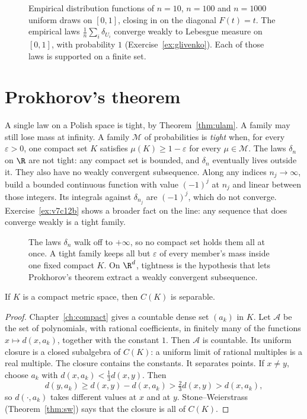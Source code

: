 \begin{figure}[ht]
\centering
{}
\caption{Empirical distribution functions of $n=10$, $n=100$ and $n=1000$ uniform draws on $[0,1]$, closing in on the diagonal $F(t)=t$.
The empirical laws $\frac1n\sum_i\delta_{U_i}$ converge weakly to Lebesgue measure on $[0,1]$, with probability $1$
(Exercise~\ref{ex:glivenko}). Each of those laws is supported on a finite set.}
\label{fig:empirical}
\end{figure}

\section{Prokhorov's theorem}

A single law on a Polish space is tight, by Theorem~\ref{thm:ulam}. A family may still lose mass at infinity. A family $\mathcal M$ of
probabilities is \emph{tight} when, for every $\varepsilon>0$, one compact set $K$ satisfies $\mu(K)\ge 1-\varepsilon$ for every $\mu\in\mathcal M$.
The laws $\delta_n$ on $\R$ are not tight: any compact set is bounded, and $\delta_n$ eventually lives outside it. They also have no weakly
convergent subsequence. Along any indices $n_j\to\infty$, build a bounded continuous function with value $(-1)^j$ at $n_j$ and linear between
those integers. Its integrals against $\delta_{n_j}$ are $(-1)^j$, which do not converge. Exercise~\ref{ex:v7c12b} shows a broader fact on the
line: any sequence that does converge weakly is a tight family.

\begin{figure}[ht]
\centering
{}
\caption{The laws $\delta_n$ walk off to $+\infty$, so no compact set holds them all at once. A tight family keeps all but $\varepsilon$ of every
member's mass inside one fixed compact $K$. On $\R^d$, tightness is the hypothesis that lets Prokhorov's theorem extract a weakly convergent
subsequence.}
\label{fig:tightmass}
\end{figure}

\begin{lemma}\label{lem:separable}
If $K$ is a compact metric space, then $C(K)$ is separable.
\end{lemma}
\begin{proof}
Chapter~\ref{ch:compact} gives a countable dense set $(a_k)$ in $K$. Let $\mathcal A$ be the set of polynomials, with rational coefficients, in
finitely many of the functions $x\mapsto d(x,a_k)$, together with the constant $1$. Then $\mathcal A$ is countable. Its uniform closure is a
closed subalgebra of $C(K)$: a uniform limit of rational multiples is a real multiple. The closure contains the constants. It separates
points. If $x\ne y$, choose $a_k$ with $d(x,a_k)<\frac13 d(x,y)$. Then
\[d(y,a_k)\ge d(x,y)-d(x,a_k)>\tfrac23 d(x,y)>d(x,a_k),\]
so $d(\cdot,a_k)$ takes different values at $x$ and at $y$. Stone--Weierstrass (Theorem~\ref{thm:sw}) says that the closure is all of $C(K)$.
\end{proof}

